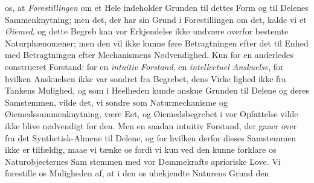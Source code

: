 \documentclass[12pt,a4paper]{book}
\begin{document}
os, at \emph{Forestillingen} om et Hele indeholder Grunden til
dettes Form og til Delenes Sammenknytning; men det, der har sin
Grund i Forestillingen om det, kalde vi et \emph{Øiemed}, og dette
Begreb kan vor Erkjendelse ikke undvære overfor bestemte
Naturphænomener; men den vil ikke kunne føre Betragtningen
efter det til Enhed med Betragtningen efter Mechanismens
Nødvendighed. Kun for en anderledes construeret Forstand: for
en \emph{intuitiv Forstand}, en \emph{intellectuel Anskuelse}, for
hvilken Anskuelsen ikke var sondret fra Begrebet, dens Virke\-%
lighed ikke fra Tankens Mulighed, og som i Heelheden kunde
anskue Grunden til Delene og deres Samstemmen, vilde det,
vi sondre som Naturmechanisme og Øiemedssammenknytning,
være Eet, og Øiemedsbegrebet i vor Opfattelse vilde ikke blive
nødvendigt for den. Men en saadan intuitiv Forstand, der
gaaer over fra det Synthetisk-Almene til Delene, og for hvilken
derfor disses Samstemmen ikke er tilfældig, maae vi tænke os
fordi vi kun ved den kunne forklare os Naturobjecternes Sam\-%
stemmen med vor Dømmekrafts aprioriske Love. Vi forestille
os Muligheden af, at i den os ubekjendte Naturens Grund den
\end{document}
